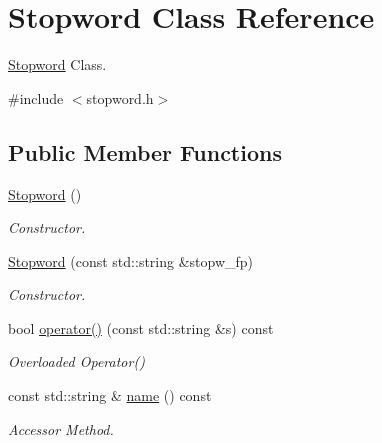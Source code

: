 \hypertarget{class_stopword}{}\section{Stopword Class Reference}
\label{class_stopword}


\hyperlink{class_stopword}{Stopword} Class.  




{\ttfamily \#include $<$stopword.\+h$>$}

\subsection*{Public Member Functions}
\begin{DoxyCompactItemize}
\item 
\hyperlink{class_stopword_a9580930ded0ee601ad610a078914a628}{Stopword} ()
\begin{DoxyCompactList}\small\item\em Constructor. \end{DoxyCompactList}\item 
\hyperlink{class_stopword_a81af802f411344af42482f7ff2856027}{Stopword} (const std\+::string \&stopw\+\_\+fp)
\begin{DoxyCompactList}\small\item\em Constructor. \end{DoxyCompactList}\item 
bool \hyperlink{class_stopword_a0f16e88a567b2e69f67a6c14f47d8655}{operator()} (const std\+::string \&s) const
\begin{DoxyCompactList}\small\item\em Overloaded Operator() \end{DoxyCompactList}\item 
const std\+::string \& \hyperlink{class_stopword_abe5022f0267536ea0191a93047f8de42}{name} () const
\begin{DoxyCompactList}\small\item\em Accessor Method. \end{DoxyCompactList}\end{DoxyCompactItemize}
